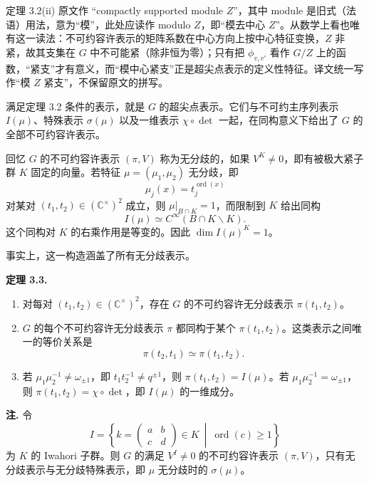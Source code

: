 \medskip
\begin{annote}
定理 3.2(ii) 原文作 “compactly supported module $Z$”，其中 module 是旧式（法语）用法，意为“模”，此处应读作 modulo $Z$，即“模去中心 $Z$”。从数学上看也唯有这一读法：不可约容许表示的矩阵系数在中心方向上按中心特征变换，$Z$ 非紧，故其支集在 $G$ 中不可能紧（除非恒为零）；只有把 $\phi_{v,v'}$ 看作 $G/Z$ 上的函数，“紧支”才有意义，而“模中心紧支”正是超尖点表示的定义性特征。译文统一写作“模 $Z$ 紧支”，不保留原文的拼写。

\par\vspace{0.15em}{\raggedleft 【来源：原书第 144 页；Bump 上书第 4 章、Gelbart 上书第 4 章（A）】\par}
\end{annote}

满足定理 3.2 条件的表示，就是 $G$ 的超尖点表示。它们与不可约主序列表示 $I(\mu)$、特殊表示 $\sigma(\mu)$ 以及一维表示 $\chi\circ\det$ 一起，在同构意义下给出了 $G$ 的全部不可约容许表示。

回忆 $G$ 的不可约容许表示 $(\pi,V)$ 称为无分歧的，如果 $V^K\ne 0$，即有被极大紧子群 $K$ 固定的向量。若特征 $\mu=(\mu_1,\mu_2)$ 无分歧，即
\[
\mu_j(x)=t_j^{\operatorname{ord}(x)}
\]
对某对 $(t_1,t_2)\in(\mathbb{C}^\times)^2$ 成立，则 $\mu|_{B\cap K}=1$，而限制到 $K$ 给出同构
\[
I(\mu)\simeq C^\infty(B\cap K\backslash K).
\]
这个同构对 $K$ 的右乘作用是等变的。因此 $\dim I(\mu)^K=1$。

事实上，这一构造涵盖了所有无分歧表示。

\medskip\noindent\textbf{定理 3.3.}\quad
\begin{enumerate}[label=(\roman*),leftmargin=2.4em,itemsep=0.15em,topsep=0.25em]
\item 对每对 $(t_1,t_2)\in(\mathbb{C}^\times)^2$，存在 $G$ 的不可约容许无分歧表示 $\pi(t_1,t_2)$。
\item $G$ 的每个不可约容许无分歧表示 $\pi$ 都同构于某个 $\pi(t_1,t_2)$。这类表示之间唯一的等价关系是
\[
\pi(t_2,t_1)\simeq\pi(t_1,t_2).
\]
\item 若 $\mu_1\mu_2^{-1}\ne\omega_{\pm1}$，即 $t_1t_2^{-1}\ne q^{\pm1}$，则 $\pi(t_1,t_2)=I(\mu)$。若 $\mu_1\mu_2^{-1}=\omega_{\pm1}$，则 $\pi(t_1,t_2)=\chi\circ\det$，即 $I(\mu)$ 的一维成分。
\end{enumerate}

\medskip\noindent\textbf{注.}\quad
令
\[
I=\left\{k=\begin{pmatrix}a&b\\c&d\end{pmatrix}\in K\ \middle|\ \operatorname{ord}(c)\ge 1\right\}
\]
为 $K$ 的 Iwahori 子群。则 $G$ 的满足 $V^I\ne0$ 的不可约容许表示 $(\pi,V)$，只有无分歧表示与无分歧特殊表示，即 $\mu$ 无分歧时的 $\sigma(\mu)$。

